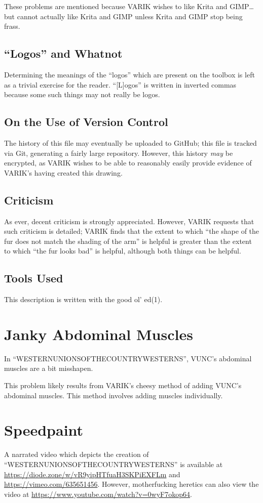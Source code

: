 \documentclass{report}
\begin{document}
These problems are mentioned because VARIK wishes to like Krita and GIMP\ldots but cannot actually like Krita and GIMP unless Krita and GIMP stop being frass.
\subsection{``Logos'' and Whatnot}
Determining the meanings of the ``logos'' which are present on the toolbox is left as a trivial exercise for the reader.  ``[L]ogos'' is written in inverted commas because some such things may not really be logos.
\subsection{On the Use of Version Control}
The history of this file may eventually be uploaded to GitHub; this file is tracked via Git, generating a fairly large repository.  However, this history \textit{may} be encrypted, as VARIK wishes to be able to reasonably easily provide evidence of VARIK's having created this drawing.
\subsection{Criticism}
As ever, decent criticism is strongly appreciated.  However, VARIK requests that such criticism is detailed; VARIK finds that the extent to which ``the shape of the fur does not match the shading of the arm'' is helpful is greater than the extent to which ``the fur looks bad'' is helpful, although both things can be helpful.
\subsection{Tools Used}
This description is written with the good ol' ed(1).
\section{Janky Abdominal Muscles}
In ``WESTERNUNIONSOFTHECOUNTRYWESTERNS'', VUNC's abdominal muscles are a bit misshapen.

This problem likely results from VARIK's cheesy method of adding VUNC's abdominal muscles.  This method involves adding muscles individually.
\section{Speedpaint}
A narrated video which depicts the creation of ``WESTERNUNIONSOFTHECOUNTRYWESTERNS'' is available at \url{https://diode.zone/w/vR9yipHTfuaH3SKPiEXFLm} and \url{https://vimeo.com/635651456}.  However, motherfucking heretics can also view the video at \url{https://www.youtube.com/watch?v=0wyF7okop64}.
\end{document}
